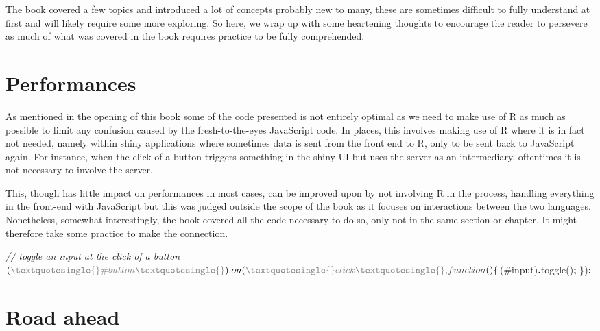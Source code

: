 \documentclass[
]{krantz}
\makeatletter
\newenvironment{Shaded}{\begin{snugshade}}{\end{snugshade}}
\newcommand{\CommentTok}[1]{\textcolor[rgb]{0.37,0.37,0.37}{\textit{#1}}}
\newcommand{\FunctionTok}[1]{\textcolor[rgb]{0,0,0}{#1}}
\newcommand{\KeywordTok}[1]{\textcolor[rgb]{0.27,0.27,0.27}{\textbf{#1}}}
\newcommand{\NormalTok}[1]{#1}
\newcommand{\OperatorTok}[1]{\textcolor[rgb]{0.43,0.43,0.43}{\textbf{#1}}}
\newcommand{\StringTok}[1]{\textcolor[rgb]{0.5,0.5,0.5}{#1}}
\newenvironment{kframe}{%
\medskip{}
\setlength{\fboxsep}{.8em}
 \def\at@end@of@kframe{}%
 \ifinner\ifhmode%
  \def\at@end@of@kframe{\end{minipage}}%
  \begin{minipage}{\columnwidth}%
 \fi\fi%
 \def\FrameCommand##1{\hskip\@totalleftmargin \hskip-\fboxsep
 \colorbox{shadecolor}{##1}\hskip-\fboxsep
     \hskip-\linewidth \hskip-\@totalleftmargin \hskip\columnwidth}%
 \MakeFramed {\advance\hsize-\width
   \@totalleftmargin\z@ \linewidth\hsize
   \@setminipage}}%
 {\par\unskip\endMakeFramed%
 \at@end@of@kframe}
\renewenvironment{Shaded}{\begin{kframe}}{\end{kframe}}
\makeatother
\begin{document}
The book covered a few topics and introduced a lot of concepts probably new to many, these are sometimes difficult to fully understand at first and will likely require some more exploring. So here, we wrap up with some heartening thoughts to encourage the reader to persevere as much of what was covered in the book requires practice to be fully comprehended.

\hypertarget{performances-1}{%
\section*{Performances}\label{performances-1}}


As mentioned in the opening of this book some of the code presented is not entirely optimal as we need to make use of R as much as possible to limit any confusion caused by the fresh-to-the-eyes JavaScript code. In places, this involves making use of R where it is in fact not needed, namely within shiny applications where sometimes data is sent from the front end to R, only to be sent back to JavaScript again. For instance, when the click of a button triggers something in the shiny UI but uses the server as an intermediary, oftentimes it is not necessary to involve the server.

This, though has little impact on performances in most cases, can be improved upon by not involving R in the process, handling everything in the front-end with JavaScript but this was judged outside the scope of the book as it focuses on interactions between the two languages. Nonetheless, somewhat interestingly, the book covered all the code necessary to do so, only not in the same section or chapter. It might therefore take some practice to make the connection.

\begin{Shaded}
\begin{Highlighting}[]
\CommentTok{// toggle an input at the click of a button}
\NormalTok{$(}\StringTok{\textquotesingle{}\#button\textquotesingle{}}\NormalTok{)}\OperatorTok{.}\FunctionTok{on}\NormalTok{(}\StringTok{\textquotesingle{}click\textquotesingle{}}\OperatorTok{,} \KeywordTok{function}\NormalTok{()\{}
\NormalTok{  $(}\StringTok{\textquotesingle{}\#input\textquotesingle{}}\NormalTok{)}\OperatorTok{.}\FunctionTok{toggle}\NormalTok{()}\OperatorTok{;}
\NormalTok{\})}\OperatorTok{;}
\end{Highlighting}
\end{Shaded}

\hypertarget{road-ahead}{%
\section*{Road ahead}\label{road-ahead}}
\end{document}
